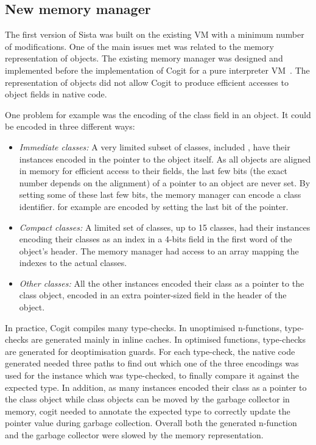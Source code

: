 \documentclass[a4paper,12pt,twoside]{../includes/ThesisStyle}
\begin{document}
\subsection{New memory manager}

The first version of Sista was built on the existing VM with a minimum number of modifications. One of the main issues met was related to the memory representation of objects. The existing memory manager was designed and implemented before the implementation of Cogit for a pure interpreter VM~\cite{Inga97a}. The representation of objects did not allow Cogit to produce efficient accesses to object fields in native code.

One problem for example was the encoding of the class field in an object. It could be encoded in three different ways:
\begin{itemize}
	\item \emph{Immediate classes:} A very limited subset of classes, included , have their instances encoded in the pointer to the object itself. As all objects are aligned in memory for efficient access to their fields, the last few bits (the exact number depends on the alignment) of a pointer to an object are never set. By setting some of these last few bits, the memory manager can encode a class identifier.  for example are encoded by setting the last bit of the pointer.
	\item \emph{Compact classes:} A limited set of classes, up to 15 classes, had their instances encoding their classes as an index in a 4-bits field in the first word of the object's header. The memory manager had access to an array mapping the indexes to the actual classes.
	\item \emph{Other classes:} All the other instances encoded their class as a pointer to the class object, encoded in an extra pointer-sized field in the header of the object.
\end{itemize}

In practice, Cogit compiles many type-checks. In unoptimised n-functions, type-checks are generated mainly in inline caches. In optimised functions, type-checks are generated for deoptimisation guards. For each type-check, the native code generated needed three paths to find out which one of the three encodings was used for the instance which was type-checked, to finally compare it against the expected type. In addition, as many instances encoded their class as a pointer to the class object while class objects can be moved by the garbage collector in memory, cogit needed to annotate the expected type to correctly update the pointer value during garbage collection. Overall both the generated n-function and the garbage collector were slowed by the memory representation.
\end{document}
